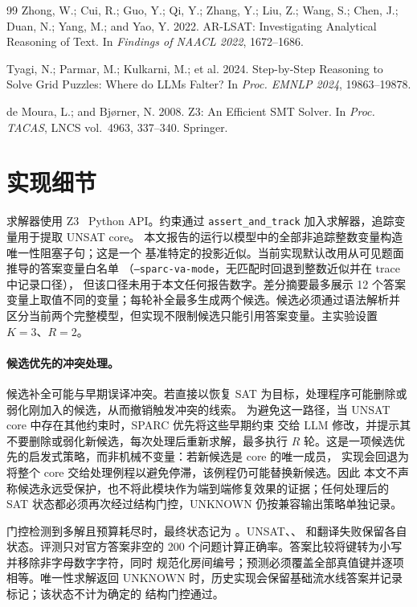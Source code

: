 \documentclass[letterpaper]{article}
\newcommand{\method}{SPARC}
\newcommand{\zthree}{Z3}
\begin{document}
\begin{thebibliography}{99}
Zhong, W.; Cui, R.; Guo, Y.; Qi, Y.; Zhang, Y.; Liu, Z.; Wang, S.; Chen, J.; Duan, N.; Yang, M.; and Yao, Y. 2022.
AR-LSAT: Investigating Analytical Reasoning of Text.
In \textit{Findings of NAACL 2022}, 1672--1686.

Tyagi, N.; Parmar, M.; Kulkarni, M.; et al. 2024.
Step-by-Step Reasoning to Solve Grid Puzzles: Where do LLMs Falter?
In \textit{Proc. EMNLP 2024}, 19863--19878.

de Moura, L.; and Bj\o{}rner, N. 2008. Z3: An Efficient SMT Solver.
In \textit{Proc. TACAS}, LNCS vol.~4963, 337--340. Springer.

\end{thebibliography}

\appendix

\section{实现细节}
\label{app:impl}

求解器使用 \zthree~\cite{demoura2008} Python API。约束通过
\texttt{assert\_and\_track} 加入求解器，追踪变量用于提取 UNSAT core。
本文报告的运行以模型中的全部非追踪整数变量构造唯一性阻塞子句；这是一个
基准特定的投影近似。当前实现默认改用从可见题面推导的答案变量白名单
（\texttt{--sparc-va-mode}，无匹配时回退到整数近似并在 trace 中记录口径），
但该口径未用于本文任何报告数字。差分摘要最多展示 12 个答案
变量上取值不同的变量；每轮补全最多生成两个候选。候选必须通过语法解析并
区分当前两个完整模型，但实现不限制候选只能引用答案变量。主实验设置
$K=3$、$R=2$。

\paragraph{候选优先的冲突处理。}候选补全可能与早期误译冲突。若直接以恢复
SAT 为目标，处理程序可能删除或弱化刚加入的候选，从而撤销触发冲突的线索。
为避免这一路径，当 UNSAT core 中存在其他约束时，\method{} 优先将这些早期约束
交给 LLM 修改，并提示其不要删除或弱化新候选，每次处理后重新求解，最多执行 $R$
轮。这是一项候选优先的启发式策略，而非机械不变量：若新候选是 core 的唯一成员，
实现会回退为将整个 core 交给处理例程以避免停滞，该例程仍可能替换新候选。因此
本文不声称候选永远受保护，也不将此模块作为端到端修复效果的证据；任何处理后的
SAT 状态都必须再次经过结构门控，UNKNOWN 仍按兼容输出策略单独记录。

门控检测到多解且预算耗尽时，最终状态记为
。UNSAT、、
 和翻译失败保留各自状态。评测只对官方答案非空的
200 个问题计算正确率。答案比较将键转为小写并移除非字母数字字符，同时
规范化房间编号；预测必须覆盖全部真值键并逐项相等。唯一性求解返回
UNKNOWN 时，历史实现会保留基础流水线答案并记录标记；该状态不计为确定的
结构门控通过。
\end{document}

